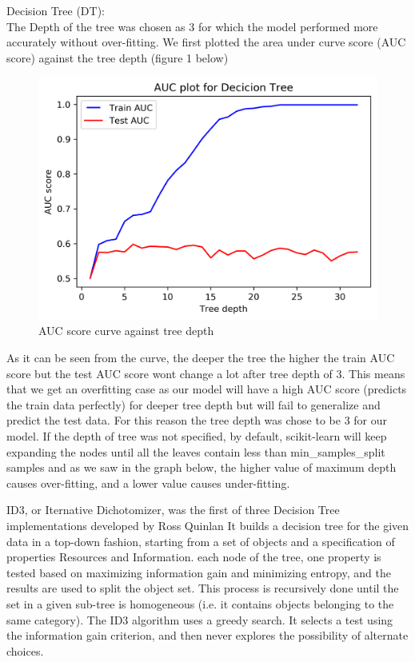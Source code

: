 Decision Tree (DT):\\ The Depth of the tree was chosen as 3 for which the model performed more accurately without over-fitting. We first plotted the area under curve score (AUC score) against the tree depth (figure 1 below)
\begin{figure}[!ht]
 \centering
\includegraphics[width=6.1in]{assignment2/1-3-DecisionTree_AUC.png}
\caption{\label{fig:fig1}AUC score curve against tree depth}
\end{figure}
As it can be seen from the curve, the deeper the tree the higher the train AUC score but the test AUC score wont change a lot after tree depth of 3. This means that we get an overfitting case as our model will have a high AUC score (predicts the train data perfectly) for deeper tree depth but will fail to generalize and predict the test data. For this reason the tree depth was chose to be 3 for our model.
If the depth of tree was not specified, by default, scikit-learn will keep expanding the nodes until all the leaves contain less than min\_samples\_split samples and as we saw in the graph below, the higher value of maximum depth causes over-fitting, and a lower value causes under-fitting\cite{ref_url1}.


ID3, or Iternative Dichotomizer, was the first of three Decision Tree implementations developed by Ross Quinlan
It builds a decision tree for the given data in a top-down fashion, starting from a set of objects and a specification of properties Resources and Information. each node of the tree, one property is tested based on maximizing information gain and minimizing entropy, and the results are used to split the object set. This process is recursively done until the set in a given sub-tree is homogeneous (i.e. it contains objects belonging to the same category). The ID3 algorithm uses a greedy search. It selects a test using the information gain criterion, and then never explores the possibility of alternate choices.

